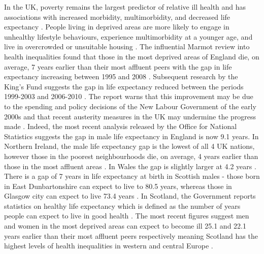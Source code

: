 \documentclass[12pt,]{report}
\begin{document}
In the UK, poverty remains the largest predictor of relative ill health
and has associations with increased morbidity, multimorbidity, and
decreased life expectancy \citep{RN37}. People living in deprived areas
are more likely to engage in unhealthy lifestyle behaviours, experience
multimorbidity at a younger age, and live in overcrowded or unsuitable
housing \citep{RN37, RN311}. The influential Marmot review into health
inequalities found that those in the most deprived areas of England die,
on average, 7 years earlier than their most affluent peers \citep{RN312}
with the gap in life expectancy increasing between 1995 and 2008
\citep{RN313}. Subsequent research by the King's Fund suggests the gap
in life expectancy reduced between the periods 1999-2003 and 2006-2010
\citep{RN314}. The report warns that this improvement may be due to the
spending and policy decisions of the New Labour Government of the early
2000s and that recent austerity measures in the UK may undermine the
progress made \citep{RN314}. Indeed, the most recent analysis released
by the Office for National Statistics \citeyearpar{RN375} suggests the
gap in male life expectancy in England is now 9.1 years. In Northern
Ireland, the male life expectancy gap is the lowest of all 4 UK nations,
however those in the poorest neighbourhoods die, on average, 4 years
earlier than those in the most affluent areas \citep{RN375}. In Wales
the gap is slightly larger at 4.2 years \citep{RN375}. There is a gap of
7 years in life expectancy at birth in Scottish males - those born in
East Dunbartonshire can expect to live to 80.5 years, whereas those in
Glasgow city can expect to live 73.4 years \citep{RN375}. In Scotland,
the Government reports statistics on healthy life expectancy which is
defined as the number of years people can expect to live in good health
\citep{RN315}. The most recent figures suggest men and women in the most
deprived areas can expect to become ill 25.1 and 22.1 years earlier than
their most affluent peers respectively \citep{RN315} meaning Scotland
has the highest levels of health inequalities in western and central
Europe \citep{RN385, RN386}.
\end{document}
